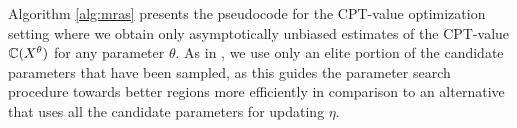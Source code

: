 Algorithm \ref{alg:mras} presents the pseudocode
for the CPT-value optimization setting where we obtain only  asymptotically unbiased estimates
of the CPT-value $\mathbb{C}(X^{\theta})$ for any parameter $\theta$.
As in \cite{chang2013simulation}, we use only an elite portion of the candidate parameters that have been sampled, as this guides the parameter search procedure towards better regions more efficiently in comparison to an alternative that uses all the candidate parameters for updating $\eta$. 



% 
% 
% 

                    

